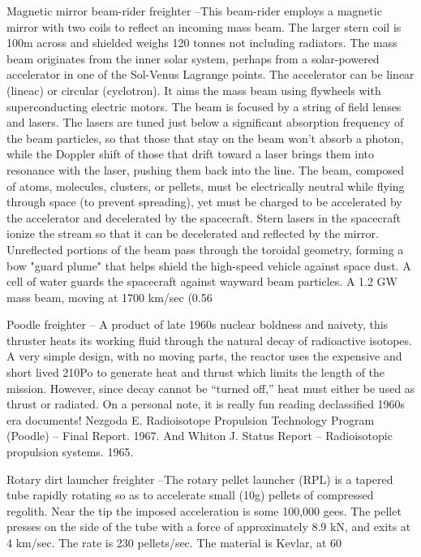 \documentclass[a4paper]{book}
\begin{document}
Magnetic mirror beam-rider freighter –This beam-rider employs a magnetic mirror with two coils to reflect an incoming mass beam. The larger stern coil is 100m across and shielded weighs 120 tonnes not including radiators. The mass beam originates from the inner solar system, perhaps from a solar-powered accelerator in one of the Sol-Venus Lagrange points. The accelerator can be linear (lineac) or circular (cyclotron). It aims the mass beam using flywheels with superconducting electric motors. The beam is focused by a string of field lenses and lasers. The lasers are tuned just below a significant absorption frequency of the beam particles, so that those that stay on the beam won’t absorb a photon, while the Doppler shift of those that drift toward a laser brings them into resonance with the laser, pushing them back into the line. The beam, composed of atoms, molecules, clusters, or pellets, must be electrically neutral while flying through space (to prevent spreading), yet must be charged to be accelerated by the accelerator and decelerated by the spacecraft. Stern lasers in the spacecraft ionize the stream so that it can be decelerated and reflected by the mirror. Unreflected portions of the beam pass through the toroidal geometry, forming a bow "guard plume" that helps shield the high-speed vehicle against space dust. A cell of water guards the spacecraft against wayward beam particles. A 1.2 GW mass beam, moving at 1700 km/sec (0.56%
 
Poodle freighter – A product of late 1960s nuclear boldness and naivety, this thruster heats its working fluid through the natural decay of radioactive isotopes.  A very simple design, with no moving parts, the reactor uses the expensive and short lived 210Po to generate heat and thrust which limits the length of the mission.  However, since decay cannot be “turned off,” heat must either be used as thrust or radiated. On a personal note, it is really fun reading declassified 1960s era documents!
Nezgoda E. Radioisotope Propulsion Technology Program (Poodle) – Final Report. 1967. And Whiton J. Status Report – Radioisotopic propulsion systems. 1965.
 
Rotary dirt launcher freighter –The rotary pellet launcher (RPL) is a tapered tube rapidly rotating so as to accelerate small (10g) pellets of compressed regolith. Near the tip the imposed acceleration is some 100,000 gees. The pellet presses on the side of the tube with a force of approximately 8.9 kN, and exits at 4 km/sec. The rate is 230 pellets/sec. The material is Kevlar, at 60%
 
\end{document}
